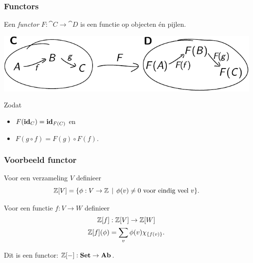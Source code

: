 \documentclass[14pt]{beamer}
\begin{document}
\begin{frame}
	\frametitle{Functors}
	Een \emph{functor} $F: \cat{C} \to \cat{D}$ is een functie op objecten \'en pijlen.

	\begin{center}
		\includegraphics[scale=0.9]{cat_functor}
	\end{center}

	Zodat
	\begin{itemize}
		\item $F(\mathbf{id}_C) = \mathbf{id}_{F(C)}$ en
		\item $F(g \circ f) = F(g) \circ F(f)$.
	\end{itemize}
\end{frame}

\begin{frame}
	\frametitle{Voorbeeld functor}

	Voor een verzameling $V$ definieer
	$$ \mathbb{Z}[V] = \{ \phi: V \to \mathbb{Z} \,\mid\, \phi(v) \neq 0 \text{ voor eindig veel } v \}. $$

	\bigskip
	Voor een functie $f: V \to W$ definieer
	\begin{gather*}
		\mathbb{Z}[f]: \mathbb{Z}[V] \to \mathbb{Z}[W] \\
		\mathbb{Z}[f](\phi) = \sum_v \phi(v) \chi_{\{f(v)\}}.
	\end{gather*}

	\bigskip
	Dit is een functor: $\mathbb{Z}[-]: \mathbf{Set} \to \mathbf{Ab}$.
\end{frame}
\end{document}
